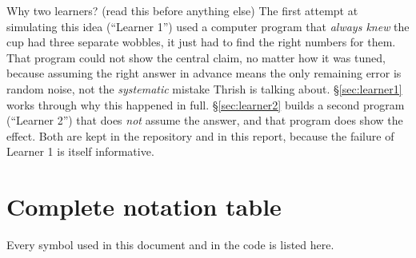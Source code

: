 \documentclass[11pt,a4paper]{article}
\begin{document}
\begin{techbox}{Why two learners? (read this before anything else)}
The first attempt at simulating this idea (``Learner 1'') used a computer
program that \emph{always knew} the cup had three separate wobbles, it just
had to find the right numbers for them. That program could not show the
central claim, no matter how it was tuned, because assuming the right answer
in advance means the only remaining error is random noise, not the
\emph{systematic} mistake Thrish is talking about. \S\ref{sec:learner1} works
through why this happened in full. \S\ref{sec:learner2} builds a second
program (``Learner 2'') that does \emph{not} assume the answer, and that
program does show the effect. Both are kept in the repository and in this
report, because the failure of Learner 1 is itself informative.
\end{techbox}

\section{Complete notation table}
\label{sec:notation}

Every symbol used in this document and in the code is listed here.
\end{document}
